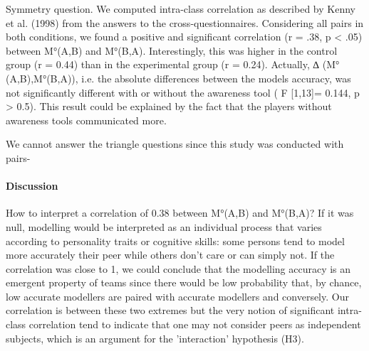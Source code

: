 \documentclass[twocolumn]{article}
\begin{document}
Symmetry question. We computed intra-class correlation as described by Kenny et
al. (1998) from the answers to the cross-questionnaires. Considering all pairs
in both conditions, we found a positive and significant correlation (r = .38, p
< .05) between M°(A,B) and M°(B,A). Interestingly, this was higher in the
control group (r = 0.44) than in the experimental group (r = 0.24). Actually, ∆
(M°(A,B),M°(B,A)), i.e. the absolute differences between the models accuracy,
was not significantly different with or without the awareness tool ( F [1,13]=
0.144, p > 0.5). This result could be explained by the fact that the players
without awareness tools communicated more.

We cannot answer the triangle questions since this study was conducted with
pairs-

\paragraph{Discussion}

How to interpret a correlation of 0.38 between M°(A,B) and M°(B,A)? If it was
null, modelling would be interpreted as an individual process that varies
according to personality traits or cognitive skills: some persons tend to model
more accurately their peer while others don't care or can simply not. If the
correlation was close to 1, we could conclude that the modelling accuracy is an
emergent property of teams since there would be low probability that, by chance,
low accurate modellers are paired with accurate modellers and conversely. Our
correlation is between these two extremes but the very notion of significant
intra-class correlation tend to indicate that one may not consider peers as
independent subjects, which is an argument for the 'interaction' hypothesis
(H3). 




\end{document}
